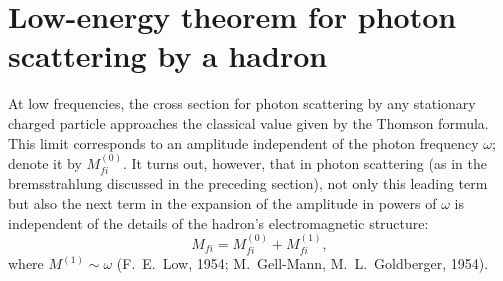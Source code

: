 \section{Low-energy theorem for photon scattering by a hadron}

At low frequencies, the cross section for photon scattering by any stationary charged particle approaches the classical value given by the Thomson formula. This limit corresponds to an amplitude independent of the photon frequency $\omega$; denote it by $M_{fi}^{(0)}$. It turns out, however, that in photon scattering (as in the bremsstrahlung discussed in the preceding section), not only this leading term but also the next term in the expansion of the amplitude in powers of $\omega$ is independent of the details of the hadron's electromagnetic structure:
\begin{equation}
M_{fi}=M_{fi}^{(0)}+M_{fi}^{(1)},
\tag{141.1}
\end{equation}
where $M^{(1)}\sim\omega$ (F.~E.~Low, 1954; M.~Gell-Mann, M.~L.~Goldberger, 1954).

